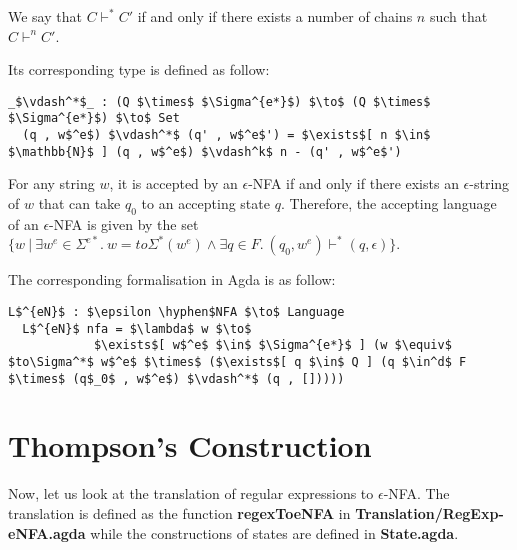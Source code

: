 \begin{defn}
\noindent We say that \(C \vdash^* C'\) if and only
if there exists a number of chains \(n\) such that \(C \vdash^n C'\). 
\end{defn}

\par Its corresponding type is defined as follow: 
\begin{lstlisting}[mathescape=true,xleftmargin=.3\textwidth]
  _$\vdash^*$_ : (Q $\times$ $\Sigma^{e*}$) $\to$ (Q $\times$ $\Sigma^{e*}$) $\to$ Set
  (q , w$^e$) $\vdash^*$ (q' , w$^e$') = $\exists$[ n $\in$ $\mathbb{N}$ ] (q , w$^e$) $\vdash^k$ n - (q' , w$^e$')
\end{lstlisting}

\begin{defn}
\label{defn:enfa}
\noindent For any string \(w\), it is accepted by an \(\epsilon\)-NFA
if and only if there exists an \(\epsilon\)-string of \(w\)
that can take \(q_0\) to an accepting state \(q\). Therefore, the
accepting language of an \(\epsilon\)-NFA is given by the set \(\{w\ |\ \exists w^e\in
\Sigma^{e*}.\ w = to\Sigma^*(w^e) \wedge \exists q\in F.\ (q_0,w^e) \vdash^* (q,\epsilon)\}\). 
\end{defn}

\par The corresponding formalisation in Agda is as follow: 
\begin{lstlisting}[mathescape=true,xleftmargin=.3\textwidth]
  L$^{eN}$ : $\epsilon \hyphen$NFA $\to$ Language
  L$^{eN}$ nfa = $\lambda$ w $\to$ 
            $\exists$[ w$^e$ $\in$ $\Sigma^{e*}$ ] (w $\equiv$ $to\Sigma^*$ w$^e$ $\times$ ($\exists$[ q $\in$ Q ] (q $\in^d$ F $\times$ (q$_0$ , w$^e$) $\vdash^*$ (q , []))))
\end{lstlisting}

\section{Thompson's Construction}
\par Now, let us look at the translation of regular expressions to
\(\epsilon\)-NFA. The translation is defined as the function
\textbf{regexToeNFA} in \textbf{Translation/RegExp-eNFA.agda} while
the constructions of states are defined in \textbf{State.agda}. 

